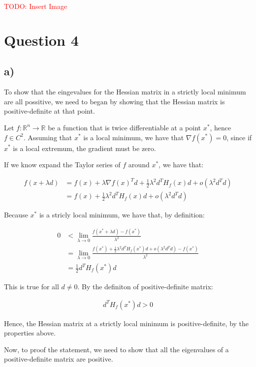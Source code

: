 \documentclass{article}
\begin{document}
\textcolor{red}{TODO: Insert Image}

\section*{Question 4}

\subsection*{a)}

To show that the eingevalues for the Hessian matrix in a strictly local minimum are all possitive, 
we need to began by showing that the Hessian matrix is positive-definite at that point.

Let $f: \mathbb{R}^n \rightarrow \mathbb{R}$ be a function that is twice differentiable at a point $x^*$, hence
$f \in C^2$. Assuming that $x^*$ is a local minimum, we have that $\nabla f(x^*) = 0$, since if $x^*$ is a local extremum,
the gradient must be zero.

If we know expand the Taylor series of $f$ around $x^*$, we have that:

\begin{align*}
    f(x + \lambda d) &= f(x) + \lambda \nabla f(x)^T d + \frac{1}{2} \lambda^2 d^T H_f(x) d + o(\lambda^2 d^T d) \\
    &= f(x) + \frac{1}{2} \lambda^2 d^T H_f(x) d + o(\lambda^2 d^T d)
\end{align*}

Because $x^*$ is a stricly local minimum, we have that, by definition:

\begin{align*}
    0 &< \lim_{\lambda \rightarrow 0} \frac{f(x^* + \lambda d) - f(x^*)}{\lambda^2} \\
    &= \lim_{\lambda \rightarrow 0} \frac{f(x^*) + \frac{1}{2} \lambda^2 d^T H_f(x^*) d + o(\lambda^2 d^T d) - f(x^*)}{\lambda^2} \\
    &= \frac{1}{2} d^T H_f(x^*) d
\end{align*}

This is true for all $d \neq 0$. By the definiton of positive-definite matrix:

\begin{align*}
    d^T H_f(x^*) d > 0
\end{align*}

Hence, the Hessian matrix at a strictly local minimum is positive-definite, by the properties above. 

Now, to proof the statement, we need to show that all the eigenvalues of a positive-definite matrix are positive.
\end{document}
